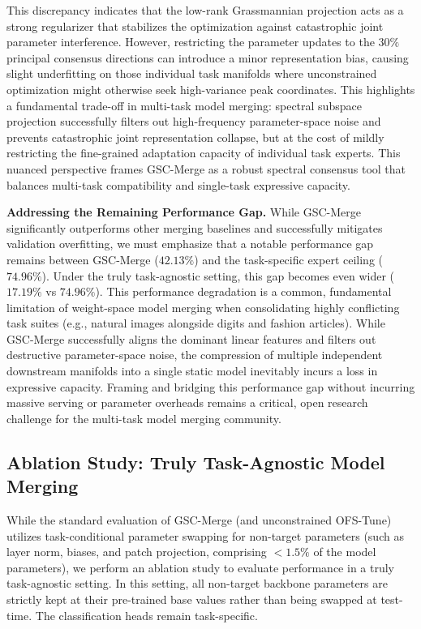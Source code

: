 This discrepancy indicates that the low-rank Grassmannian projection acts as a strong regularizer that stabilizes the optimization against catastrophic joint parameter interference. However, restricting the parameter updates to the $30\%$ principal consensus directions can introduce a minor representation bias, causing slight underfitting on those individual task manifolds where unconstrained optimization might otherwise seek high-variance peak coordinates. This highlights a fundamental trade-off in multi-task model merging: spectral subspace projection successfully filters out high-frequency parameter-space noise and prevents catastrophic joint representation collapse, but at the cost of mildly restricting the fine-grained adaptation capacity of individual task experts. This nuanced perspective frames GSC-Merge as a robust spectral consensus tool that balances multi-task compatibility and single-task expressive capacity.

\textbf{Addressing the Remaining Performance Gap.} While GSC-Merge significantly outperforms other merging baselines and successfully mitigates validation overfitting, we must emphasize that a notable performance gap remains between GSC-Merge ($42.13\%$) and the task-specific expert ceiling ($74.96\%$). Under the truly task-agnostic setting, this gap becomes even wider ($17.19\%$ vs $74.96\%$). This performance degradation is a common, fundamental limitation of weight-space model merging when consolidating highly conflicting task suites (e.g., natural images alongside digits and fashion articles). While GSC-Merge successfully aligns the dominant linear features and filters out destructive parameter-space noise, the compression of multiple independent downstream manifolds into a single static model inevitably incurs a loss in expressive capacity. Framing and bridging this performance gap without incurring massive serving or parameter overheads remains a critical, open research challenge for the multi-task model merging community.

\subsection{Ablation Study: Truly Task-Agnostic Model Merging}
\label{subsec:task_agnostic_ablation}

While the standard evaluation of GSC-Merge (and unconstrained OFS-Tune) utilizes task-conditional parameter swapping for non-target parameters (such as layer norm, biases, and patch projection, comprising $<1.5\%$ of the model parameters), we perform an ablation study to evaluate performance in a truly task-agnostic setting. In this setting, all non-target backbone parameters are strictly kept at their pre-trained base values rather than being swapped at test-time. The classification heads remain task-specific.

